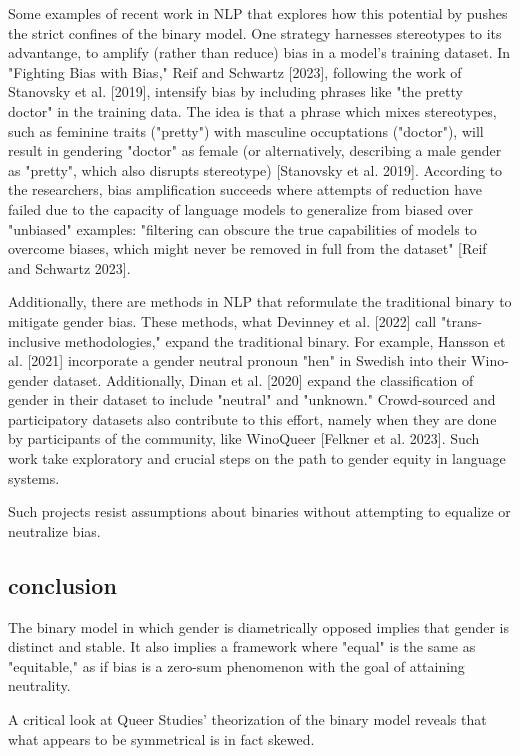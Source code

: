 \documentclass[11pt]{article}
\begin{document}
Some examples of recent work in NLP that explores how this potential
by pushes the strict confines of the binary model. One strategy
harnesses stereotypes to its advantange, to amplify (rather than
reduce) bias in a model's training dataset. In "Fighting Bias with
Bias," Reif and Schwartz [2023], following the work of Stanovsky et
al. [2019], intensify bias by including phrases like "the pretty
doctor" in the training data. The idea is that a phrase which mixes
stereotypes, such as feminine traits ("pretty") with masculine
occuptations ("doctor"), will result in gendering "doctor" as female
(or alternatively, describing a male gender as "pretty", which also
disrupts stereotype) [Stanovsky et al. 2019]. According to the
researchers, bias amplification succeeds where attempts of reduction
have failed due to the capacity of language models to generalize from
biased over "unbiased" examples: "filtering can obscure the true
capabilities of models to overcome biases, which might never be
removed in full from the dataset" [Reif and Schwartz 2023].

Additionally, there are methods in NLP that reformulate the
traditional binary to mitigate gender bias. These methods, what
Devinney et al. [2022] call "trans-inclusive methodologies," expand
the traditional binary. For example, Hansson et al. [2021] incorporate
a gender neutral pronoun "hen" in Swedish into their Wino-gender
dataset. Additionally, Dinan et al. [2020] expand the classification
of gender in their dataset to include "neutral" and "unknown."
Crowd-sourced and participatory datasets also contribute to this
effort, namely when they are done by participants of the community,
like WinoQueer [Felkner et al. 2023]. Such work take exploratory and
crucial steps on the path to gender equity in language systems.

Such projects resist assumptions about binaries without attempting to
equalize or neutralize bias.

\subsection{conclusion}
\label{sec:org22cd408}
The binary model in which gender is diametrically opposed implies that
gender is distinct and stable. It also implies a framework where
"equal" is the same as "equitable," as if bias is a zero-sum
phenomenon with the goal of attaining neutrality.

A critical look at Queer Studies' theorization of the binary model
reveals that what appears to be symmetrical is in fact skewed.
\end{document}
